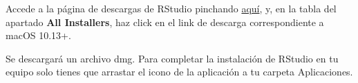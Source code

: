 \documentclass[]{book}
\begin{document}
Accede a la página de descargas de RStudio pinchando \href{https://rstudio.com/products/rstudio/download/\#download}{aquí}, y, en la tabla del apartado \textbf{All Installers}, haz click en el link de descarga correspondiente a macOS 10.13+.

Se descargará un archivo dmg. Para completar la instalación de RStudio en tu equipo solo tienes que arrastar el icono de la aplicación a tu carpeta Aplicaciones.


\end{document}
